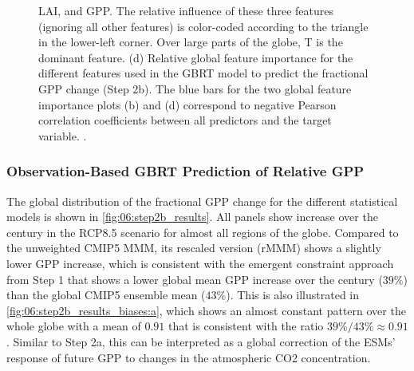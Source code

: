 \begin{figure}[p]
{    \acf{LAI}, and \acs{GPP}. The relative influence of these three features
    (ignoring all other features) is color-coded according to the triangle in
    the lower-left corner. Over large parts of the globe, \acs{T} is the
    dominant feature. (d) Relative global feature importance for the different
    features used in the \acs{GBRT} model to predict the fractional \acs{GPP}
    change (Step 2b). The blue bars for the two global feature importance plots
    (b) and (d) correspond to negative Pearson correlation coefficients between
    all predictors and the target variable. .
  }
  \label{fig:06:step2b_ml_inference}
\end{figure}


\subsubsection{Observation-Based \acs{GBRT} Prediction of Relative \acs{GPP}}
\label{subsubsec:06:results_step2b_obs}

The global distribution of the fractional \ac{GPP} change for the different
statistical models is shown in \cref{fig:06:step2b_results}. All panels show
 increase over the  century in the \acs{RCP}8.5 scenario for
almost all regions of the globe. Compared to the unweighted \acs{CMIP}5
\ac{MMM}, its rescaled version (r\acs{MMM}) shows a slightly lower \ac{GPP}
increase, which is consistent with the emergent constraint approach from Step 1
that shows a lower global mean \ac{GPP} increase over the  century ($39
\unit{\%}$) than the global \acs{CMIP}5 ensemble mean ($43 \unit{\%}$). This is
also illustrated in \cref{fig:06:step2b_results_biases:a}, which shows an
almost constant pattern over the whole globe with a mean of $0.91$ that is
consistent with the ratio $39 \unit{\%} / 43 \unit{\%} \approx 0.91$. Similar
to Step 2a, this can be interpreted as a global correction of the \acp{ESM}'
response of future \ac{GPP} to changes in the atmospheric \ac{CO2}
concentration.

